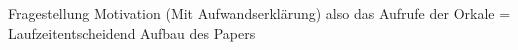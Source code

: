 Fragestellung
Motivation (Mit Aufwandserklärung) also das Aufrufe der Orkale = Laufzeitentscheidend
Aufbau des Papers